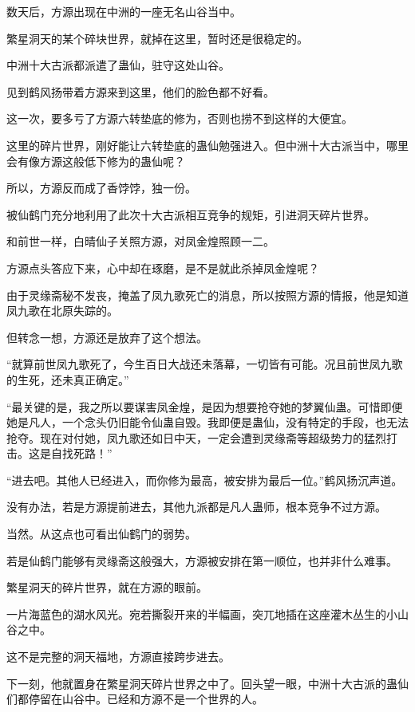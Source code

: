 
\begin{this_body}

数天后，方源出现在中洲的一座无名山谷当中。

繁星洞天的某个碎块世界，就掉在这里，暂时还是很稳定的。

中洲十大古派都派遣了蛊仙，驻守这处山谷。

见到鹤风扬带着方源来到这里，他们的脸色都不好看。

这一次，要多亏了方源六转垫底的修为，否则也捞不到这样的大便宜。

这里的碎片世界，刚好能让六转垫底的蛊仙勉强进入。但中洲十大古派当中，哪里会有像方源这般低下修为的蛊仙呢？

所以，方源反而成了香饽饽，独一份。

被仙鹤门充分地利用了此次十大古派相互竞争的规矩，引进洞天碎片世界。

和前世一样，白晴仙子关照方源，对凤金煌照顾一二。

方源点头答应下来，心中却在琢磨，是不是就此杀掉凤金煌呢？

由于灵缘斋秘不发丧，掩盖了凤九歌死亡的消息，所以按照方源的情报，他是知道凤九歌在北原失踪的。

但转念一想，方源还是放弃了这个想法。

“就算前世凤九歌死了，今生百日大战还未落幕，一切皆有可能。况且前世凤九歌的生死，还未真正确定。”

“最关键的是，我之所以要谋害凤金煌，是因为想要抢夺她的梦翼仙蛊。可惜即便她是凡人，一个念头仍旧能令仙蛊自毁。我即便是蛊仙，没有特定的手段，也无法抢夺。现在对付她，凤九歌还如日中天，一定会遭到灵缘斋等超级势力的猛烈打击。这是自找死路！”

“进去吧。其他人已经进入，而你修为最高，被安排为最后一位。”鹤风扬沉声道。

没有办法，若是方源提前进去，其他九派都是凡人蛊师，根本竞争不过方源。

当然。从这点也可看出仙鹤门的弱势。

若是仙鹤门能够有灵缘斋这般强大，方源被安排在第一顺位，也并非什么难事。

繁星洞天的碎片世界，就在方源的眼前。

一片海蓝色的湖水风光。宛若撕裂开来的半幅画，突兀地插在这座灌木丛生的小山谷之中。

这不是完整的洞天福地，方源直接跨步进去。

下一刻，他就置身在繁星洞天碎片世界之中了。回头望一眼，中洲十大古派的蛊仙们都停留在山谷中。已经和方源不是一个世界的人。


\end{this_body}
